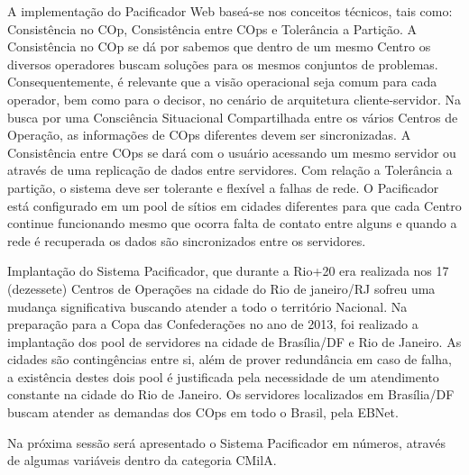 A implementação do Pacificador Web baseá-se nos conceitos técnicos, tais como: Consistência no COp, Consistência entre COps e Tolerância a Partição. A Consistência no COp se dá por sabemos que dentro de um mesmo Centro os diversos operadores buscam soluções para os mesmos conjuntos de problemas. Consequentemente, é relevante que a visão operacional seja comum para cada operador, bem como para o decisor, no cenário de arquitetura cliente-servidor. Na busca por uma Consciência Situacional Compartilhada entre os vários Centros de Operação, as informações de COps diferentes devem ser sincronizadas. A Consistência entre COps se dará com o usuário acessando um mesmo servidor ou através de uma replicação de dados entre servidores. Com relação a Tolerância a partição, o sistema deve ser tolerante e flexível a falhas de rede. O Pacificador está configurado em um pool de sítios em cidades diferentes para que cada Centro continue funcionando mesmo que ocorra falta de contato entre alguns e quando a rede é recuperada os dados são sincronizados entre os servidores.

Implantação do Sistema Pacificador, que durante a Rio+20 era realizada nos 17 (dezessete) Centros de Operações na cidade do Rio de janeiro/RJ sofreu uma mudança significativa buscando atender a todo o território Nacional. Na preparação para a Copa
das Confederações no ano de 2013, foi realizado a implantação dos pool de servidores na cidade de Brasília/DF e Rio de Janeiro. As cidades são contingências entre si, além de prover redundância em caso de falha, a existência destes dois pool é justificada pela necessidade de um atendimento constante na cidade do Rio de Janeiro. Os servidores localizados em Brasília/DF buscam atender as demandas dos COps em todo o Brasil, pela EBNet.

Na próxima sessão será apresentado o Sistema Pacificador em números, através de algumas variáveis dentro da categoria CMilA.
